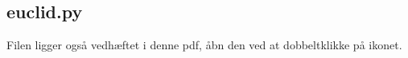 \subsection{euclid.py}
\label{file:euclid}
Filen ligger også vedhæftet i denne pdf, åbn den ved at dobbeltklikke på ikonet.
\inputminted[python3, linenos, breaklines, frame=lines, fontsize=\footnotesize]{python}{src/euclid.py}
